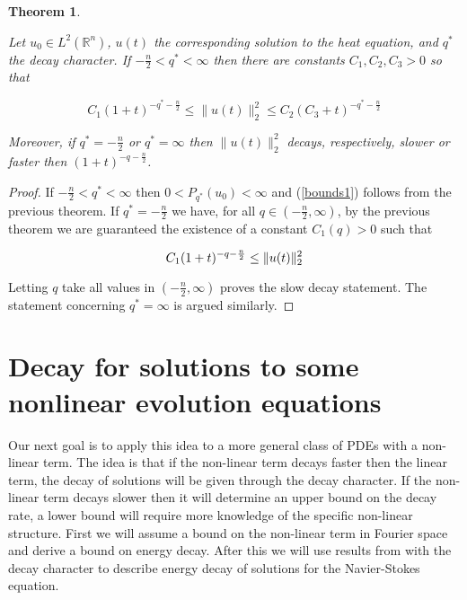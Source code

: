 \documentclass{amsart}
\newtheorem {Theorem}  {Theorem}
\numberwithin{Theorem}{section}
\numberwithin{equation}{section}
\theoremstyle{definition}
\theoremstyle{remark}
\begin{document}
\begin{Theorem}\label{cor:decaycharacter}

Let $u_0\in L^2(\mathbb{R}^n)$, $u(t)$ the corresponding solution to the heat equation, and $q^*$ the decay character.  If $-\frac{n}{2}<q^*<\infty$ then there are constants $C_1,C_2,C_3>0$ so that

\begin{equation}
C_1(1+t)^{-q^*-\frac{n}{2}} \leq \|u(t)\|_2^2 \leq C_2(C_3+t)^{-q^*-\frac{n}{2}}\label{bounds1}
\end{equation}

Moreover, if $q^*=-\frac{n}{2}$ or $q^*=\infty$ then $\|u(t)\|_2^2$ decays, respectively, slower or faster then  $(1+t)^{-q-\frac{n}{2}}$.

\end{Theorem}

\begin{proof}

If $-\frac{n}{2}<q^*<\infty$ then $0<P_{q^*}(u_0)<\infty$ and (\ref{bounds1}) follows from the previous theorem.  If $q^*=-\frac{n}{2}$ we have, for all $q\in(-\frac{n}{2},\infty)$, by the previous theorem we are guaranteed the existence of a constant $C_1(q)>0$ such that

\begin{equation}
C_1(1+t)^{-q-\frac{n}{2}} \leq \|u(t)\|_2^2\notag
\end{equation}

Letting $q$ take all values in $(-\frac{n}{2},\infty)$ proves the slow decay statement.  The statement concerning $q^*=\infty$ is argued similarly.

\end{proof}

\section{Decay for solutions to some nonlinear evolution equations}

Our next goal is to apply this idea to a more general class of PDEs
with a non-linear term.  The idea is that if
the non-linear term decays faster then the linear term, the decay of
solutions will be given through the decay character.  If the
non-linear term decays slower then it will determine an upper bound
on the decay rate, a lower bound will require more knowledge of the
specific non-linear structure.  First we will assume a bound
on the non-linear term in Fourier space and derive a bound on
energy decay.  After this we will use results from \cite{W} with the
decay character to describe energy decay of solutions for the
Navier-Stokes equation.
\end{document}
